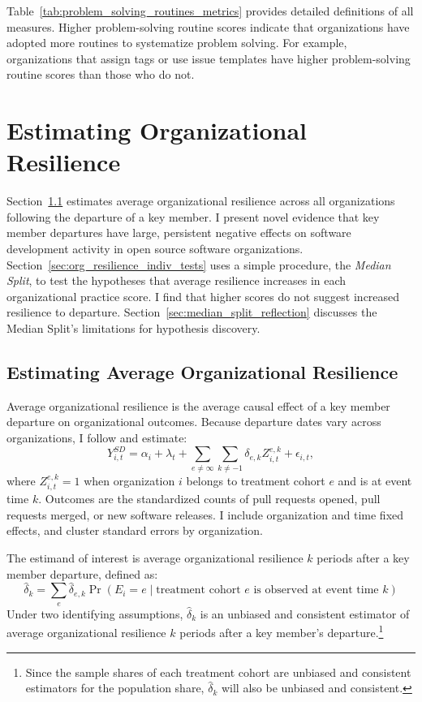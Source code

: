 \documentclass[12pt,notitlepage]{article}
\begin{document}
Table~\ref{tab:problem_solving_routines_metrics} provides detailed definitions of all \RoutinesMeasureCount{} measures.
Higher problem-solving routine scores indicate that organizations have adopted more routines to systematize problem solving. 
For example, organizations that assign tags or use issue templates have higher problem-solving routine scores than those who do not. 

\section{Estimating Organizational Resilience} \label{sec:org_resilience_estimate}
Section~\ref{sec:org_resilience} estimates average organizational resilience across all organizations following the departure of a key member.
I present novel evidence that key member departures have large, persistent negative effects on software development activity in open source software organizations. 
Section~\ref{sec:org_resilience_indiv_tests} uses a simple procedure, the \textit{Median Split}, to test the hypotheses that average resilience increases in each organizational practice score.
I find that higher scores do not suggest increased resilience to departure.
Section~\ref{sec:median_split_reflection} discusses the Median Split’s limitations for hypothesis discovery.


\subsection{Estimating Average Organizational Resilience}\label{sec:org_resilience}
Average organizational resilience is the average causal effect of a key member departure on organizational outcomes.
Because departure dates vary across organizations, I follow \cite{sun_estimating_2021} and estimate:
\begin{equation}
Y_{i,t}^{SD} = \alpha_i + \lambda_t + \sum_{e \neq \infty} \sum_{k \neq -1} \delta_{e,k} Z_{i,t}^{e,k} + \epsilon_{i,t}, \label{eq:event_study}
\end{equation}
where $Z_{i,t}^{e,k}=1$ when organization $i$ belongs to treatment cohort $e$ and is at event time $k$.
Outcomes are the standardized counts of pull requests opened, pull requests merged, or new software releases.
I include organization and time fixed effects, and cluster standard errors by organization.

The estimand of interest is average organizational resilience $k$ periods after a key member departure, defined as:
\begin{equation}\label{eq:event_time}
    \hat{\delta}_k = \sum_{e} \hat{\delta}_{e,k} \Pr(E_i = e \mid \text{treatment cohort } e \text{ is observed at event time } k)
\end{equation}
Under two identifying assumptions, $\hat{\delta}_k$ is an unbiased and consistent estimator of average organizational resilience $k$ periods after a key member's departure.\footnote{Since the sample shares of each treatment cohort are unbiased and consistent estimators for the population share, $\hat{\delta}_k$ will also be unbiased and consistent.}
\end{document}
